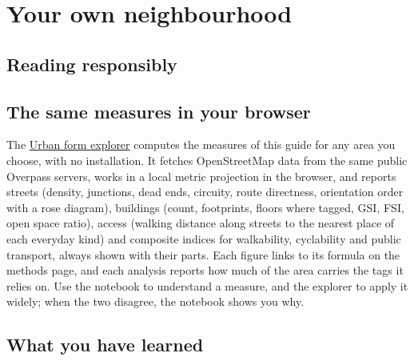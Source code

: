 \chapter{Your own neighbourhood}\label{ch:practice}

\section{Reading responsibly}


\section{The same measures in your browser}
The \href{https://ahmadammar.github.io/urban-form-explorer/}{Urban form explorer} computes the measures of this guide for any area you choose, with no installation. It fetches OpenStreetMap data from the same public Overpass servers, works in a local metric projection in the browser, and reports streets (density, junctions, dead ends, circuity, route directness, orientation order with a rose diagram), buildings (count, footprints, floors where tagged, GSI, FSI, open space ratio), access (walking distance along streets to the nearest place of each everyday kind) and composite indices for walkability, cyclability and public transport, always shown with their parts. Each figure links to its formula on the methods page, and each analysis reports how much of the area carries the tags it relies on. Use the notebook to understand a measure, and the explorer to apply it widely; when the two disagree, the notebook shows you why.

\section{What you have learned}

